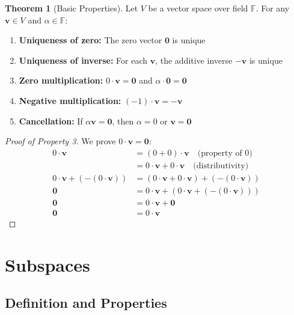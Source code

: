 \documentclass[12pt,a4paper]{article}
\theoremstyle{definition}
\newtheorem{theorem}{Theorem}[section]
\begin{document}
\begin{theorem}[Basic Properties]
Let $V$ be a vector space over field $\mathbb{F}$. For any $\mathbf{v} \in V$ and $\alpha \in \mathbb{F}$:

\begin{enumerate}
    \item \textbf{Uniqueness of zero:} The zero vector $\mathbf{0}$ is unique
    \item \textbf{Uniqueness of inverse:} For each $\mathbf{v}$, the additive inverse $-\mathbf{v}$ is unique
    \item \textbf{Zero multiplication:} $0 \cdot \mathbf{v} = \mathbf{0}$ and $\alpha \cdot \mathbf{0} = \mathbf{0}$
    \item \textbf{Negative multiplication:} $(-1) \cdot \mathbf{v} = -\mathbf{v}$
    \item \textbf{Cancellation:} If $\alpha \mathbf{v} = \mathbf{0}$, then $\alpha = 0$ or $\mathbf{v} = \mathbf{0}$
\end{enumerate}
\end{theorem}

\begin{proof}[Proof of Property 3]
We prove $0 \cdot \mathbf{v} = \mathbf{0}$:
\begin{align}
0 \cdot \mathbf{v} &= (0 + 0) \cdot \mathbf{v} \quad \text{(property of 0)} \\
&= 0 \cdot \mathbf{v} + 0 \cdot \mathbf{v} \quad \text{(distributivity)} \\
0 \cdot \mathbf{v} + (-(0 \cdot \mathbf{v})) &= (0 \cdot \mathbf{v} + 0 \cdot \mathbf{v}) + (-(0 \cdot \mathbf{v})) \\
\mathbf{0} &= 0 \cdot \mathbf{v} + (0 \cdot \mathbf{v} + (-(0 \cdot \mathbf{v}))) \\
\mathbf{0} &= 0 \cdot \mathbf{v} + \mathbf{0} \\
\mathbf{0} &= 0 \cdot \mathbf{v}
\end{align}
\end{proof}

\section{Subspaces}

\subsection{Definition and Properties}
\end{document}
